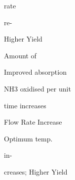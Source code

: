 \documentclass[a4paper,portrait,12pt]{article}
\begin{document}
\begin{flushleft}
rate
\end{flushleft}





\begin{flushleft}
re-
\end{flushleft}





\begin{flushleft}
Higher Yield
\end{flushleft}





\begin{flushleft}
Amount of
\end{flushleft}





\begin{flushleft}
Improved absorption
\end{flushleft}





\begin{flushleft}
NH3 oxidised per unit
\end{flushleft}


\begin{flushleft}
time increases
\end{flushleft}


\begin{flushleft}
Flow Rate Increase
\end{flushleft}





\begin{flushleft}
Optimum temp.
\end{flushleft}





\begin{flushleft}
in-
\end{flushleft}





\begin{flushleft}
creases; Higher Yield
\end{flushleft}
\end{document}
